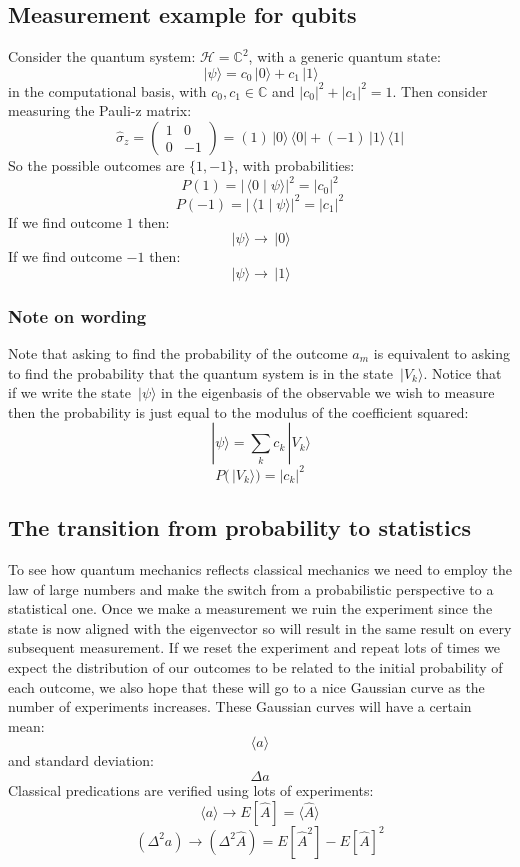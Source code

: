 \documentclass[12pt]{article}
\newcommand{\ket}[1]{\,|#1\rangle}
\newcommand{\bra}[1]{\,\langle #1|}
\newcommand{\braket}[2]{\,\langle #1\mid #2\rangle}
\begin{document}
\subsection*{Measurement example for qubits}
Consider the quantum system: \(\mathcal{H}=\mathbb{C}^2\), with a generic quantum state:
\[\ket{\psi}=c_0\ket{0}+c_1\ket{1}\]
in the computational basis, with \(c_0,c_1\in \mathbb{C}\) and \(|c_0|^2+|c_1|^2=1\). Then consider measuring the Pauli-z matrix:
\[\hat{\sigma}_z=\begin{pmatrix}
    1 & 0 \\
    0 & -1
\end{pmatrix}=(1)\ket{0}\bra{0}+(-1)\ket{1}\bra{1}\]
So the possible outcomes are \(\{1,-1\}\), with probabilities:
\[P(1)=|\braket{0}{\psi}|^2=|c_0|^2\]
\[P(-1)=|\braket{1}{\psi}|^2=|c_1|^2\]
If we find outcome \(1\) then:
\[\ket{\psi}\to \ket{0}\]
If we find outcome \(-1\) then:
\[\ket{\psi}\to\ket{1}\]
\subsubsection*{Note on wording}
Note that asking to find the probability of the outcome \(a_m\) is equivalent to asking to find the probability that the quantum system is in the state \(\ket{V_k}\). Notice that if we write the state \(\ket{\psi}\) in the eigenbasis of the observable we wish to measure then the probability is just equal to the modulus of the coefficient squared:
\[\ket\psi=\sum_kc_k\ket{V_k}\]
\[P(\ket{V_k})=|c_k|^2\]
\subsection*{The transition from probability to statistics}
To see how quantum mechanics reflects classical mechanics we need to employ the law of large numbers and make the switch from a probabilistic perspective to a statistical one. Once we make a measurement we ruin the experiment since the state is now aligned with the eigenvector so will result in the same result on every subsequent measurement. If we reset the experiment and repeat lots of times we expect the distribution of our outcomes to be related to the initial probability of each outcome, we also hope that these will go to a nice Gaussian curve as the number of experiments increases. These Gaussian curves will have a certain mean:
\[\langle a\rangle\]
and standard deviation:
\[\Delta a\]
Classical predications are verified using lots of experiments:
\[\langle a\rangle \to E[\hat{A}]=\langle \hat{A}\rangle\]
\[(\Delta^2 a)\to (\Delta^2\hat{A})=E[\hat{A}^2]-E[\hat{A}]^2\]
\end{document}

